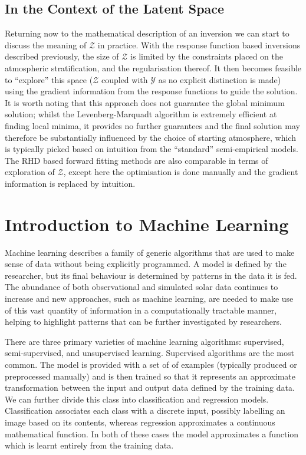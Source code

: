 \subsection{In the Context of the Latent Space}

Returning now to the mathematical description of an inversion we can start to discuss the meaning of $\mathcal{Z}$ in practice.
With the response function based inversions described previously, the size of $\mathcal{Z}$ is limited by the constraints placed on the atmospheric stratification, and the regularisation thereof.
It then becomes feasible to ``explore'' this space ($\mathcal{Z}$ coupled with $\mathcal{Y}$ as no explicit distinction is made) using the gradient information from the response functions to guide the solution.
It is worth noting that this approach does not guarantee the global minimum solution; whilst the Levenberg-Marquadt algorithm is extremely efficient at finding local minima, it provides no further guarantees and the final solution may therefore be substantially influenced by the choice of starting atmosphere, which is typically picked based on intuition from the ``standard'' semi-empirical models.
The RHD based forward fitting methods are also comparable in terms of exploration of $\mathcal{Z}$, except here the optimisation is done manually and the gradient information is replaced by intuition.


\section{Introduction to Machine Learning}

Machine learning describes a family of generic algorithms that are used to make sense of data without being explicitly programmed.
A model is defined by the researcher, but its final behaviour is determined by patterns in the data it is fed.
The abundance of both observational and simulated solar data continues to increase and new approaches, such as machine learning, are needed to make use of this vast quantity of information in a computationally tractable manner, helping to highlight patterns that can be further investigated by researchers.

There are three primary varieties of machine learning algorithms: supervised, semi-supervised, and unsupervised learning.
Supervised algorithms are the most common.
The model is provided with a set of of examples (typically produced or preprocessed manually) and is then trained so that it represents an approximate transformation between the input and output data defined by the training data.
We can further divide this class into classification and regression models.
Classification associates each class with a discrete input, possibly labelling an image based on its contents, whereas regression approximates a continuous mathematical function.
In both of these cases the model approximates a function which is learnt entirely from the training data.

